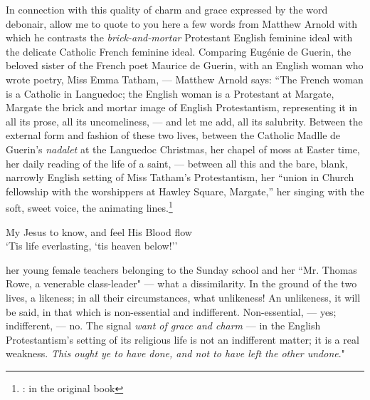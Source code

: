 In connection with this quality of charm and grace expressed by the word debonair, allow me to quote to you here a few words from Matthew Arnold with which he contrasts the \emph{brick-and-mortar} Protestant English feminine ideal with the delicate Catholic French feminine ideal.
Comparing Eug\'enie de Guerin, the beloved sister of the French poet Maurice de Guerin, with an English woman who wrote poetry, Miss Emma Tatham, --- Matthew Arnold says: ``The French woman is a Catholic in Languedoc; the English woman is a Protestant at Margate, Margate the brick and mortar image of English Protestantism, representing it in all its prose, all its uncomeliness, --- and let me add, all its salubrity.
Between the external form and fashion of these two lives, between the Catholic Madlle de Guerin's \emph{nadalet} at the Languedoc Christmas, her chapel of moss at Easter time, her daily reading of the life of a saint, --- between all this and the bare, blank, narrowly English setting of Miss Tatham's Protestantism, her ``union in Church fellowship with the worshippers at Hawley Square, Margate,'' her singing with the soft, sweet voice, the animating lines.\footnote{: in the original book}
\begin{center}
   My Jesus to know, and feel His Blood flow\\
   `Tis life everlasting, `tis heaven below!''\\
\end{center}
her young female teachers belonging to the Sunday school and her ``Mr. Thomas Rowe, a venerable class-leader" --- what a dissimilarity.
In the ground of the two lives, a likeness; in all their circumstances, what unlikeness!
An unlikeness, it will be said, in that which is non-essential and indifferent.
Non-essential, --- yes; indifferent, --- no.
The signal \emph{want of grace and charm} --- in the English Protestantism's setting of its religious life is not an indifferent matter; it is a real weakness.
\emph{This ought ye to have done, and not to have left the other undone}."

